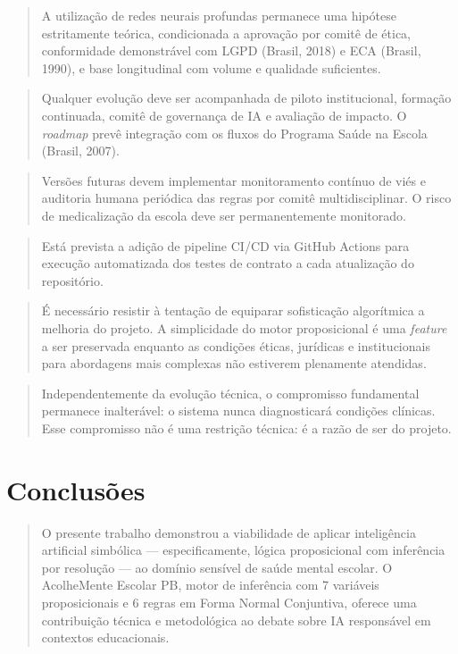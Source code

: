 \documentclass[11pt]{article}
\begin{document}
\begin{quote}
A utilização de redes neurais profundas permanece uma hipótese
estritamente teórica, condicionada a aprovação por comitê de ética,
conformidade demonstrável com LGPD (Brasil, 2018) e ECA (Brasil, 1990),
e base longitudinal com volume e qualidade suficientes.
\end{quote}

\begin{quote}
Qualquer evolução deve ser acompanhada de piloto institucional, formação
continuada, comitê de governança de IA e avaliação de impacto. O
\emph{roadmap} prevê integração com os fluxos do Programa Saúde na
Escola (Brasil, 2007).
\end{quote}

\begin{quote}
Versões futuras devem implementar monitoramento contínuo de viés e
auditoria humana periódica das regras por comitê multidisciplinar. O
risco de medicalização da escola deve ser permanentemente monitorado.
\end{quote}

\begin{quote}
Está prevista a adição de pipeline CI/CD via GitHub Actions para
execução automatizada dos testes de contrato a cada atualização do
repositório.
\end{quote}

\begin{quote}
É necessário resistir à tentação de equiparar sofisticação algorítmica a
melhoria do projeto. A simplicidade do motor proposicional é uma
\emph{feature} a ser preservada enquanto as condições éticas, jurídicas
e institucionais para abordagens mais complexas não estiverem plenamente
atendidas.
\end{quote}

\begin{quote}
Independentemente da evolução técnica, o compromisso fundamental
permanece inalterável: o sistema nunca diagnosticará condições clínicas.
Esse compromisso não é uma restrição técnica: é a razão de ser do
projeto.
\end{quote}

    \section{Conclusões}\label{conclusuxf5es}

\begin{quote}
O presente trabalho demonstrou a viabilidade de aplicar inteligência
artificial simbólica --- especificamente, lógica proposicional com
inferência por resolução --- ao domínio sensível de saúde mental
escolar. O AcolheMente Escolar PB, motor de inferência com 7 variáveis
proposicionais e 6 regras em Forma Normal Conjuntiva, oferece uma
contribuição técnica e metodológica ao debate sobre IA responsável em
contextos educacionais.
\end{quote}
\end{document}
